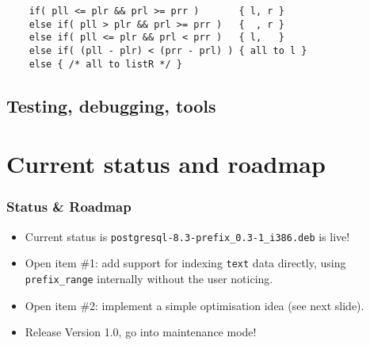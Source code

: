\documentclass{beamer}
\begin{document}
\begin{frame}[fragile]
\begin{overprint}
  \begin{example}
  \begin{verbatim}
    if( pll <= plr && prl >= prr )       { l, r }
    else if( pll > plr && prl >= prr )   {  , r }
    else if( pll <= plr && prl < prr )   { l,   }
    else if( (pll - plr) < (prr - prl) ) { all to l }
    else { /* all to listR */ }

  \end{verbatim}
  \end{example}

  \end{overprint}

\end{frame}

\subsection{Testing, debugging, tools}







\section{Current status and roadmap}

\begin{frame}[fragile]
  \frametitle{Status \& Roadmap}

  \begin{itemize}

   \item<1-> Current status is \texttt{postgresql-8.3-prefix\_0.3-1\_i386.deb}
     is live!

   \item<2-> Open item \#1: add support for indexing \texttt{text} data
     directly, using \texttt{prefix\_range} internally without the user
     noticing.

   \item<3-> Open item \#2: implement a simple optimisation idea (see next
     slide).

   \item<4-> Release Version 1.0, go into maintenance mode!

  \end{itemize}
\end{frame}
\end{document}
